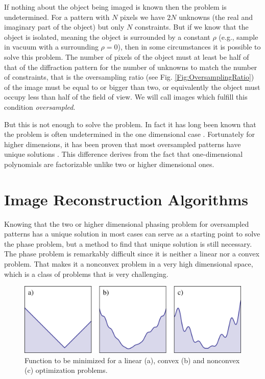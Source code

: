 If nothing about the object being imaged is known then the problem is
undetermined. For a pattern with $N$ pixels we have $2N$ unknowns (the real and
imaginary part of the object) but only $N$ constraints. But if we know that the object is isolated, meaning the
object is surrounded by a constant $\rho$ (e.g., sample in vacuum with a
surrounding $\rho = 0$), then in some circumstances it is possible to solve this
problem. The number of pixels of the object must at least be half of that of the
diffraction pattern for the number of unknowns to match the number of
constraints, that is the oversampling ratio (see
Fig. \ref{Fig:OversamplingRatio}) of the image must be equal to or bigger than
two, or equivalently the object must occupy less than half of the field of
view. We will call images which fulfill this condition {\em oversampled}.

But this is not enough to solve the problem. In fact it
has long been known that the problem is often undetermined in the one dimensional case
\cite{Walther1963Question}. Fortunately for higher dimensions, it has
been proven that most oversampled patterns have unique solutions
\cite{Bruck1979Ambiguity}. This difference derives from the fact that one-dimensional
polynomials are factorizable unlike two or higher dimensional ones.

\section{Image Reconstruction Algorithms}

Knowing that the two or higher dimensional phasing problem for oversampled
patterns has a unique solution in most cases can serve as a starting point to
solve the phase problem, but a method to find that unique solution is still
necessary. The phase problem is remarkably difficult since it is neither a
linear nor a convex problem. That makes it a nonconvex problem in a very high
dimensional space, which is a class of problems that is very challenging.

\begin{figure}[h]
  \centering
  \includegraphics[width=1 \columnwidth]{Image_Reconstruction/convexity.png}
  \caption{Function to be minimized for a linear (a), convex (b) and nonconvex
    (c) optimization problems.}
  \label{Fig:Convexity}
\end{figure}

